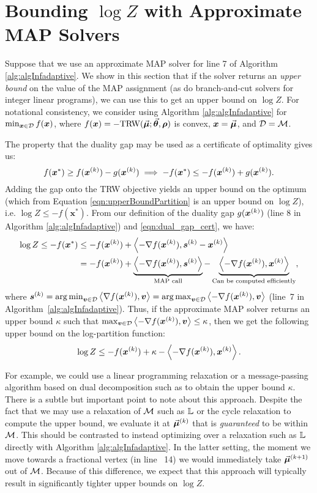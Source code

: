 \section{Bounding $\log Z$ with Approximate MAP Solvers\label{sec:approx_map_logz}}

Suppose that we use an approximate MAP solver for line 7 of Algorithm \ref{alg:algInfadaptive}.
We show in this section that if the solver returns an {\em upper bound} on the value of the MAP
assignment (as do branch-and-cut solvers for integer linear programs), we can use this to get an upper bound on $\log Z$.
%
%
For notational consistency, we consider using Algorithm
\ref{alg:algInfadaptive} for $\min_{\bm{x}\in\mathcal{D}}f(\bm{x})$, where
$f(\bm{x}) = -\text{TRW}(\vec{\bm{\mu}};\vec{\bm{\theta}},\bm{\rho})$ is convex, $\bm{x}=\vec{\bm{\mu}}$, and $\mathcal{D} = \mathcal{M}$.

The property that the duality gap may be used as a certificate of optimality \citep{jaggi2013revisiting} gives us:
\begin{equation}
	\label{eqn:dual_gap_cert}
f(\bm{x}^*)\geq f(\bm{x}^{(k)})-g(\bm{x}^{(k)})\implies -f(\bm{x}^*)\leq -f(\bm{x}^{(k)}) + g(\bm{x}^{(k)}).
\end{equation}
Adding the gap onto the TRW objective yields an upper bound on the optimum (which from Equation \ref{eqn:upperBoundPartition} is an
upper bound on $\log Z$), i.e. $\log Z\leq -f(\bm{x}^*)$. From our definition of the duality gap $g(\bm{x}^{(k)})$ (line 8 in Algorithm \ref{alg:algInfadaptive}) and \eqref{eqn:dual_gap_cert}, we have:
\begin{align*}
\log Z \leq -f(\bm{x}^*)     &\leq -f(\bm{x}^{(k)}) + \left\langle -\nabla f(\bm{x}^{(k)}) , \bm{s}^{(k)}-\bm{x}^{(k)} \right\rangle \\
&= -f(\bm{x}^{(k)}) + \underbrace{\left\langle -\nabla f(\bm{x}^{(k)}) , \bm{s}^{(k)} \right\rangle}_{\text{MAP call}} - \underbrace{\left\langle -\nabla f(\bm{x}^{(k)}) , \bm{x}^{(k)} \right\rangle}_{\text{Can be computed efficiently}},
\end{align*}
where $\bm{s}^{(k)} = \operatorname*{\arg\min}_{\bm{v}\in\mathcal{D}}\left\langle \nabla f(\bm{x}^{(k)}) , \bm{v} \right\rangle =
\operatorname*{\arg\max}_{\bm{v}\in\mathcal{D}}\left\langle -\nabla f(\bm{x}^{(k)}) , \bm{v} \right\rangle$ (line~7 in Algorithm~\ref{alg:algInfadaptive}). Thus, if the approximate MAP solver returns
an upper bound $\kappa$ such that $\max_{\bm{v}\in\mathcal{D}}\left\langle -\nabla
  f(\bm{x}^{(k)}) , \bm{v} \right\rangle \leq \kappa$, then we get the following upper bound on the
log-partition function:
\begin{equation}
\log Z \leq -f(\bm{x}^{(k)}) + \kappa - \left\langle -\nabla f(\bm{x}^{(k)}) , \bm{x}^{(k)} \right\rangle.
\end{equation}
%
%

For example, we could use a linear programming relaxation or a
message-passing algorithm based on dual decomposition such as
\citet{SontagEtAl_uai08} to obtain the upper bound $\kappa$.
There is a subtle but important point to note about this approach.
Despite the fact that we may use a relaxation
of $\mathcal{M}$ such as $\mathbb{L}$ or the cycle relaxation to compute the upper bound, we evaluate it at $\vec{\bm{\mu}}^{(k)}$
that is {\em guaranteed} to be within $\mathcal{M}$. This should be
contrasted to instead optimizing over a relaxation such as $\mathbb{L}$ directly with Algorithm \ref{alg:algInfadaptive}. 
In the latter setting, the moment we move towards a fractional vertex (in line ~14)
we would immediately take $\vec{\bm{\mu}}^{(k+1)}$ out of $\mathcal{M}$. Because
of this difference, we expect that this approach will typically result in
significantly tighter upper bounds on $\log Z$.

